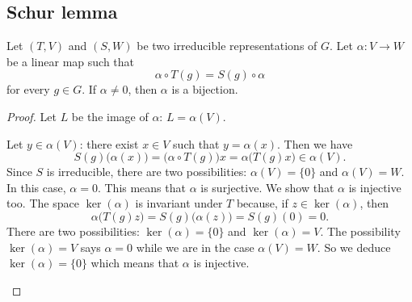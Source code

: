 \subsection{Schur lemma}

\begin{lemma}
    Let \( (T,V)\) and \( (S,W)\) be two irreducible representations of \( G\). Let \( \alpha\colon V\to W\) be a linear map such that
    \begin{equation}
        \alpha\circ T(g)=S(g)\circ \alpha
    \end{equation}
    for every \( g\in G\). If \( \alpha\neq 0\), then \( \alpha\) is a bijection.
\end{lemma}

\begin{proof}
    Let \( L\) be the image of \( \alpha\): \( L=\alpha(V)\).
    \begin{subproof}
            Let \( y\in \alpha(V)\): there exist \( x\in V\) such that \( y=\alpha(x)\). Then we have
            \begin{equation}
                S(g)\big( \alpha(x) \big)=\big( \alpha\circ T(g) \big)x=\alpha\big( T(g)x \big)\in \alpha(V).
            \end{equation}
            Since \( S\) is irreducible, there are two possibilities: \( \alpha(V)=\{ 0 \}\) and \( \alpha(V)=W\).
        \spitem[First: \( \alpha(V)=\{ 0 \}\)]
            In this case, \( \alpha=0\).
        \spitem[Second: \( \alpha(V)=W\)]
            This means that \( \alpha\) is surjective. We show that \( \alpha\) is injective too. The space \( \ker(\alpha)\) is invariant under \( T\) because, if \( z\in \ker(\alpha)\), then
            \begin{equation}
                \alpha\big( T(g)z \big)=S(g)\big( \alpha(z) \big)=S(g)(0)=0.
            \end{equation}
            There are two possibilities: \( \ker(\alpha)=\{ 0 \}\) and \( \ker(\alpha)=V\). The possibility \( \ker(\alpha)=V\) says \( \alpha=0\) while we are in the case \( \alpha(V)=W\). So we deduce \( \ker(\alpha)=\{ 0 \}\) which means that \( \alpha\) is injective.
    \end{subproof}
\end{proof}

